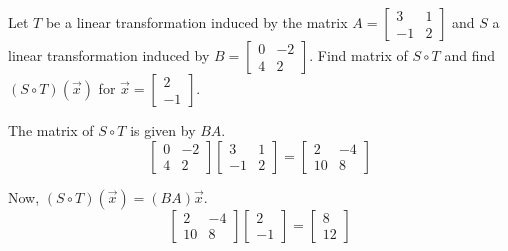\documentclass{ximera}
\begin{document}
\begin{problem}\label{prb:6.5} Let $T$ be a linear transformation induced by the matrix $A = \left[ \begin{array}{rr}
3 & 1 \\
-1 & 2
\end{array}\right]$ and $S$ a linear transformation induced by $B = \left[ \begin{array}{rr}
0 & -2 \\
4 & 2
\end{array}\right]$. Find matrix of $S \circ T$ and find $\left( S \circ T \right) \left( \vec{x} \right)$ for $\vec{x} = \left[ \begin{array}{r}
2 \\
-1
\end{array} \right]$.
\begin{hint}
The matrix of $S \circ T$ is given by $BA$.
\[
\left[ \begin{array}{rr}
0 & -2 \\
4 & 2
\end{array}\right] \left[ \begin{array}{rr}
3 & 1 \\
-1 & 2
\end{array}\right] = \left[
\begin{array}{rr}
2 & -4 \\
10 & 8
\end{array}
\right]
\]

Now, $\left( S \circ T \right) \left( \vec{x} \right) = (BA) \vec{x}$.
\[
 \left[
\begin{array}{rr}
2 & -4 \\
10 & 8
\end{array}
\right]
\left[ \begin{array}{r}
2 \\
-1
\end{array} \right]
=
\left[
\begin{array}{r}
8 \\
12
\end{array}
\right]
\]

\end{hint}
\end{problem}
\end{document}
